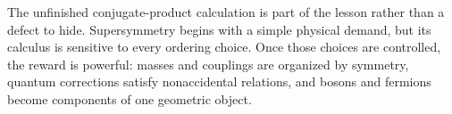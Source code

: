 The unfinished conjugate-product calculation is part of the lesson rather than a defect to hide. Supersymmetry begins with a simple physical demand, but its calculus is sensitive to every ordering choice. Once those choices are controlled, the reward is powerful: masses and couplings are organized by symmetry, quantum corrections satisfy nonaccidental relations, and bosons and fermions become components of one geometric object.
